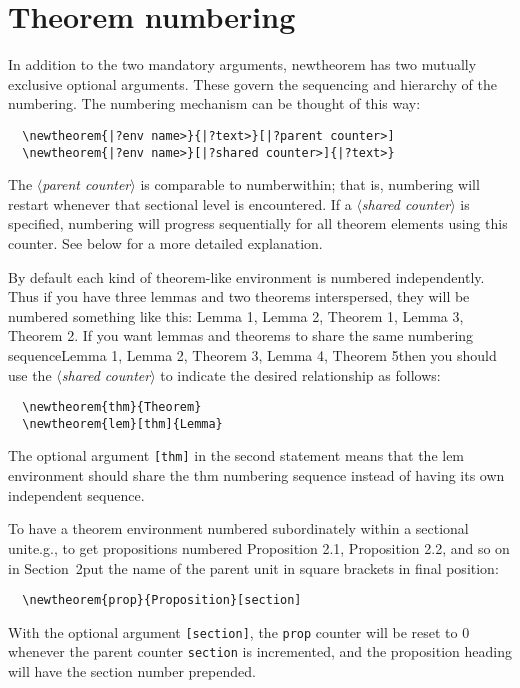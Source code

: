 \documentclass[11pt,twoside]{article}
\providecommand{\mdash}{\textemdash\penalty\hyphenpenalty}
\newcommand{\ntt}{%
  \fontfamily\ttdefault \fontseries\mddefault \fontshape\updefault
  \selectfont
}
\DeclareRobustCommand{\cn}[1]{{\ntt\bslchar#1}}
\DeclareRobustCommand{\env}[1]{{\ntt#1}}
\def\<#1>{{\normalfont$\langle$\textit{#1}$\rangle$}}
\begin{document}
\section{Theorem numbering}

In addition to the two mandatory arguments, \cn{newtheorem} has two
mutually exclusive optional arguments. These govern the
sequencing and hierarchy of the numbering.
The numbering mechanism can be thought of this way:
\begin{verbatim}
  \newtheorem{|?env name>}{|?text>}[|?parent counter>]
  \newtheorem{|?env name>}[|?shared counter>]{|?text>}
\end{verbatim}
The \<parent counter> is comparable to \cn{numberwithin}; that is,
numbering will restart whenever that sectional level is encountered.
If a \<shared counter> is specified, numbering will progress
sequentially for all theorem elements using this counter.  See
below for a more detailed explanation.


By default each kind of theorem-like environment is numbered
independently. Thus if you have three lemmas and two theorems
interspersed, they will be numbered something like this: Lemma 1, Lemma
2, Theorem 1, Lemma 3, Theorem 2. If you want lemmas and theorems to
share the same numbering sequence\mdash Lemma 1, Lemma 2, Theorem 3, Lemma
4, Theorem 5\mdash then you should use the \<shared counter> to indicate
the desired relationship as follows:
\begin{verbatim}
  \newtheorem{thm}{Theorem}
  \newtheorem{lem}[thm]{Lemma}
\end{verbatim}
The optional argument \verb+[thm]+ in the second statement means that
the \env{lem} environment should share the \env{thm} numbering
sequence instead of having its own independent sequence.

To have a theorem environment numbered subordinately within a
sectional unit\mdash e.g., to get propositions numbered Proposition 2.1,
Proposition 2.2, and so on in Section~2\mdash put the name of the parent
unit in square brackets in final position:
\begin{verbatim}
  \newtheorem{prop}{Proposition}[section]
\end{verbatim}
With the optional argument \verb+[section]+, the \verb+prop+ counter
will be reset to 0 whenever the parent counter \verb+section+ is
incremented, and the proposition heading will have the section number
prepended.
\end{document}

